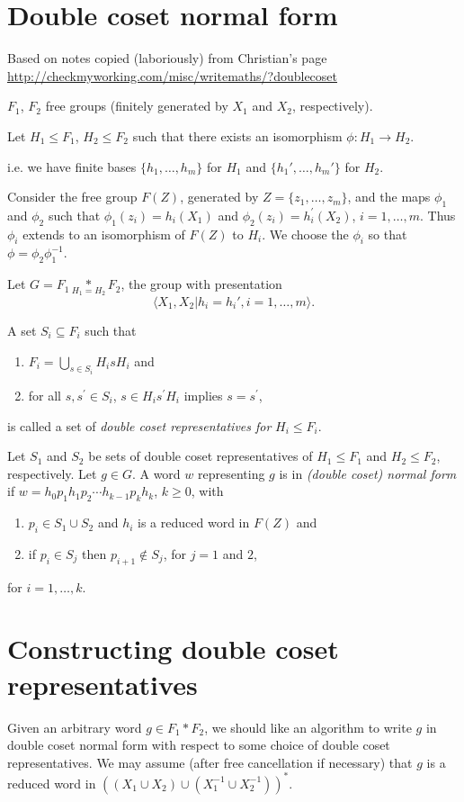 \documentclass[a4paper,12pt]{article}
\numberwithin{equation}{section}
\numberwithin{figure}{section}
\newcommand{\la}{\langle}
\newcommand{\ra}{\rangle}
\newcommand{\be}{\begin{enumerate}}
\newcommand{\ee}{\end{enumerate}}
\begin{document}
\section{Double coset normal form}\label{sec:intro}
Based on notes copied (laboriously) from Christian's page
\url{
http://checkmyworking.com/misc/writemaths/?doublecoset
}

$F_1$, $F_2$ free groups (finitely generated by $X_1$
and $X_2$, respectively).

Let $H_1 \leq F_1$, $H_2 \leq F_2$ such that
there exists an isomorphism $\phi: H_1 \rightarrow H_2$.

i.e. we have finite bases $\{h_1, \ldots, h_m \}$  for $H_1$ and
$\{h_1', \ldots, h_m'\}$ for $H_2$.

Consider the free group $F(Z)$, generated by $Z=\{z_1, \ldots, z_m\}$,
and the maps $\phi_1$ and $\phi_2$ such that
$\phi_1(z_i)=h_i(X_1)  $ and  $\phi_2(z_i)=h^\prime_i(X_2)$, $i=1,\ldots ,m$.
Thus $\phi_i$ extends to an isomorphism of $F(Z)$ to $H_i$. We choose
the $\phi_i$ so that $\phi=\phi_2\phi_1^{-1}$.

Let ${G = F_1 \underset{H_1=H_2}{\ast} F_2}$, the group with
 presentation \[\la X_1,X_2 | h_i = h_i', i=1, \ldots ,m\ra.\]

A  set $S_i \subseteq F_i$ such that
\be
\item
$F_i = \displaystyle{\bigcup_{s \in S_i} H_isH_i}$
and
\item
for all $s, s^\prime \in S_i$, $s\in H_i s^\prime H_i$
implies $s=s^\prime$,
\ee
is called a set of \emph{double coset representatives for} $H_i\le F_i$.

Let $S_1$ and $S_2$ be sets of  double coset representatives of
$H_1\le F_1$ and $H_2\le F_2$, respectively. Let $g \in G$.
A word $w$ representing $g$ is in \emph{(double coset) normal form} if
$w = h_{0}p_1h_{1}p_2 \cdots h_{k-1}p_kh_{{k}}$, $k\ge 0$,  with
\be
\item $p_i \in S_1\cup S_2$  and $h_i$ is a reduced word in $F(Z)$ and
\item if $p_i\in S_j$ then $p_{i+1}\notin S_j$, for $j=1$ and $2$,
\ee
for $i = 1, \ldots ,k$.


\section{Constructing double coset representatives}\label{sec:dcforms}

Given an arbitrary word $g\in F_1\ast F_2$,
we should like an algorithm to write $g$ in double coset normal form
with respect to some choice of double coset representatives. We may
assume (after free cancellation if necessary) that $g$ is a
reduced word in $((X_1\cup X_2)\cup ( X_1^{-1}\cup X_2^{-1}))^\ast$.
\end{document}
